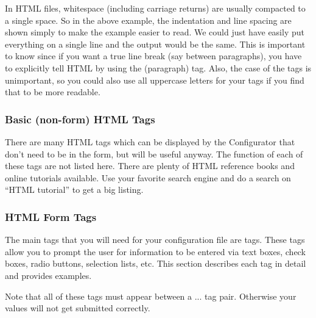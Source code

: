 In HTML files, whitespace (including carriage returns) are usually
compacted to a single space. So in the above example, the indentation
and line spacing are shown simply to make the example easier to read.
We could just have easily put everything on a single line and the
output would be the same. This is important to know since if you want
a true line break (say between paragraphs), you have to explicitly
tell HTML by using the  (paragraph) tag. Also, the case of the
tags is unimportant, so you could also use all uppercase letters for
your tags if you find that to be more readable.


\subsubsection*{Basic (non-form) HTML Tags}

There are many HTML tags which can be displayed by the Configurator
that don't need to be in the form, but will be useful anyway. The
function of each of these tags are not listed here. There are plenty
of HTML reference books and online tutorials available. Use your favorite
search engine and do a search on {}``HTML tutorial'' to get a big
listing.


\subsubsection*{HTML Form Tags}

The main tags that you will need for your configuration file are 
tags. These tags allow you to prompt the user for information to be
entered via text boxes, check boxes, radio buttons, selection lists,
etc. This section describes each tag in detail and provides examples.

Note that all of these tags must appear between a ...
tag pair. Otherwise your values will not get submitted correctly.


